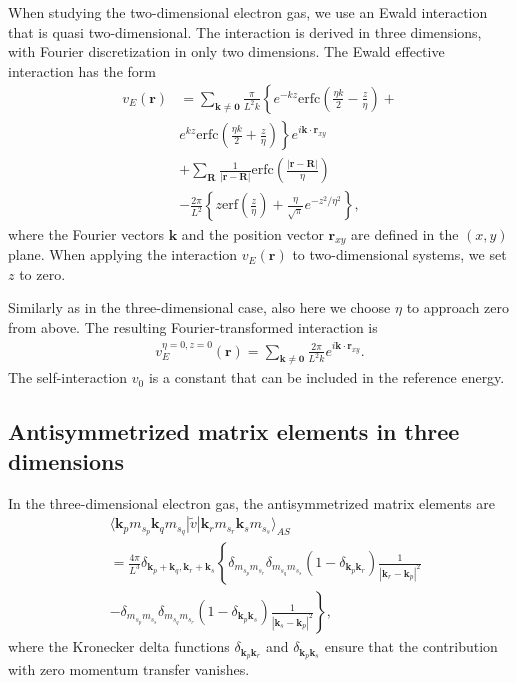 \documentclass[%
oneside,                 %
final,                   %
10pt]{article}
\begin{document}
When studying the two-dimensional electron gas, we
use an Ewald interaction that is quasi two-dimensional.
The interaction is derived in three dimensions, with 
Fourier discretization in only two dimensions. The Ewald effective
interaction has the form 
\begin{align}
  v_{E}(\mathbf{r}) &= \sum_{\mathbf{k} \neq \mathbf{0}} 
  \frac{\pi }{L^{2}k}\left\{ e^{-kz} \mathrm{erfc} \left(
  \frac{\eta k}{2} - \frac{z}{\eta }\right)+ \right. \nonumber \\
  & \left. e^{kz}\mathrm{erfc} \left( \frac{\eta k}{2} + \frac{z}{\eta }
  \right) \right\} e^{i\mathbf{k}\cdot \mathbf{r}_{xy}} 
  \nonumber \\
  & + \sum_{\mathbf{R}}\frac{1}{\left| \mathbf{r}-\mathbf{R}
    \right| } \mathrm{erfc} \left( \frac{\left| \mathbf{r}-\mathbf{R}
    \right|}{\eta }\right) \nonumber \\
  & - \frac{2\pi}{L^{2}}\left\{ z\mathrm{erf} \left( \frac{z}{\eta }
  \right) + \frac{\eta }{\sqrt{\pi }}e^{-z^{2}/\eta^{2}}\right\},
\end{align}
where the Fourier vectors $\mathbf{k}$ and the position vector
$\mathbf{r}_{xy}$ are defined in the $(x,y)$ plane. When
applying the interaction $v_{E}(\mathbf{r})$ to two-dimensional
systems, we set $z$ to zero. 


Similarly as in the 
three-dimensional case, also here we 
choose $\eta $ to approach zero from above. The resulting 
Fourier-transformed interaction is
\begin{align}
  v_{E}^{\eta = 0, z = 0}(\mathbf{r}) = \sum_{\mathbf{k} \neq \mathbf{0}} 
  \frac{2\pi }{L^{2}k}e^{i\mathbf{k}\cdot \mathbf{r}_{xy}}. 
\end{align}
The self-interaction $v_{0}$ is a constant that can be 
included in the reference energy.




\subsection{Antisymmetrized matrix elements in three dimensions}

In the three-dimensional electron gas, the antisymmetrized
matrix elements are
\begin{align} \label{eq:vmat_3dheg}
  & \langle \mathbf{k}_{p}m_{s_{p}}\mathbf{k}_{q}m_{s_{q}}
  |\tilde{v}|\mathbf{k}_{r}m_{s_{r}}\mathbf{k}_{s}m_{s_{s}}\rangle_{AS} 
  \nonumber \\
  & = \frac{4\pi }{L^{3}}\delta_{\mathbf{k}_{p}+\mathbf{k}_{q},
    \mathbf{k}_{r}+\mathbf{k}_{s}}\left\{ 
  \delta_{m_{s_{p}}m_{s_{r}}}\delta_{m_{s_{q}}m_{s_{s}}}
  \left( 1 - \delta_{\mathbf{k}_{p}\mathbf{k}_{r}}\right) 
  \frac{1}{|\mathbf{k}_{r}-\mathbf{k}_{p}|^{2}}
  \right. \nonumber \\
  & \left. - \delta_{m_{s_{p}}m_{s_{s}}}\delta_{m_{s_{q}}m_{s_{r}}}
  \left( 1 - \delta_{\mathbf{k}_{p}\mathbf{k}_{s}} \right)
  \frac{1}{|\mathbf{k}_{s}-\mathbf{k}_{p}|^{2}} 
  \right\} ,
\end{align}
where the Kronecker delta functions 
$\delta_{\mathbf{k}_{p}\mathbf{k}_{r}}$ and
$\delta_{\mathbf{k}_{p}\mathbf{k}_{s}}$ ensure that the 
contribution with zero momentum transfer vanishes.
\end{document}
